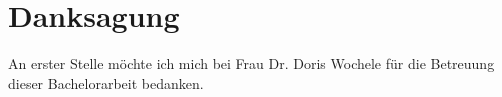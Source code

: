 \section{Danksagung}

An erster Stelle möchte ich mich bei Frau Dr. Doris Wochele für die Betreuung dieser Bachelorarbeit bedanken.